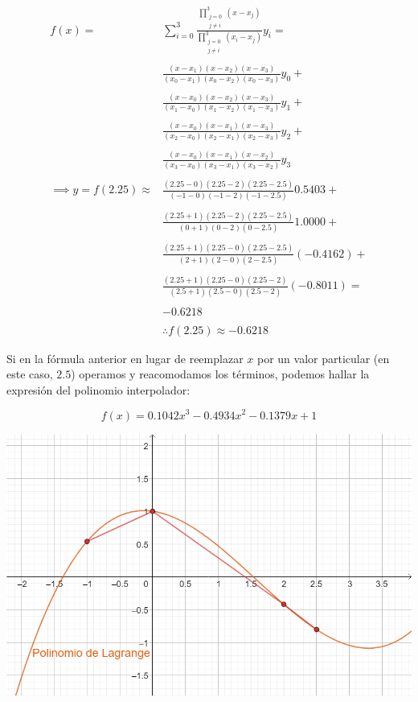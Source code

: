 \documentclass[openany]{book}
\begin{document}
\[
\begin{split}
f(x) =& \sum_{i = 0}^3 \frac{\prod\limits_{\substack{j = 0\\ j \neq i}}^3 (x - x_j)}{\prod\limits_{\substack{j = 0\\ j \neq i}}^3 (x_i - x_j)} y_i = \\ \\
& \frac{(x - x_1)(x - x_2)(x - x_3)}{(x_0 - x_1)(x_0 - x_2)(x_0 - x_3)} y_0 + \\ \\
&\frac{(x - x_0)(x - x_2)(x - x_3)}{(x_1 - x_0)(x_1 - x_2)(x_1 - x_3)} y_1 + \\ \\
&\frac{(x - x_0)(x - x_1)(x - x_3)}{(x_2 - x_0)(x_2 - x_1)(x_2 - x_3)} y_2 + \\ \\
&\frac{(x - x_0)(x - x_1)(x - x_2)}{(x_3 - x_0)(x_3 - x_1)(x_3 - x_2)} y_3 \\ \\
\implies y = f(2.25) \approx & \frac{(2.25 - 0)(2.25 - 2)(2.25 - 2.5)}{(-1-0)(-1-2)(-1-2.5)} 0.5403 + \\ \\
&\frac{(2.25 +1)(2.25 - 2)(2.25 - 2.5)}{(0+1)(0-2)(0-2.5)} 1.0000 + \\ \\
&\frac{(2.25 +1)(2.25 - 0)(2.25 - 2.5)}{(2+1)(2-0)(2-2.5)} (-0.4162) + \\ \\
&\frac{(2.25 +1)(2.25 - 0)(2.25 - 2)}{(2.5+1)(2.5-0)(2.5-2)} (-0.8011) = \\ \\
& -0.6218 \\ \\
&\therefore f(2.25) \approx -0.6218
\end{split}
\]

Si en la fórmula anterior en lugar de reemplazar \(x\) por un valor particular (en este caso, \(2.5\)) operamos y reacomodamos los términos, podemos hallar la expresión del polinomio interpolador:

\[
f(x) = 0.1042 x^3 -0.4934 x^2 -0.1379 x+1
\]

\begin{center}\includegraphics[width=0.6\linewidth]{Plots/U4/lagrej2} \end{center}
\end{document}
